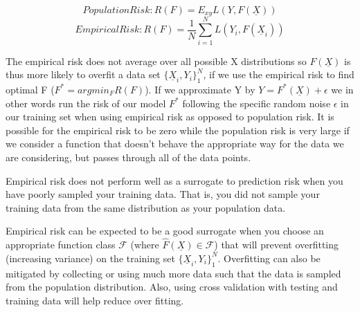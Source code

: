 \documentclass[11pt]{article}
\begin{document}
$$Population Risk: R(F) = E_{xy}L(Y,F(\underline{X}))$$
$$ Empirical Risk: R(F) = \frac{1}{N}\sum_{i=1}^NL(Y_i, F(\underline{X}_i))$$ 

\vspace{5 mm}
\noindent
The empirical risk does not average over all possible X distributions so 
$F(\underline{X})$ is thus more likely to overfit a data set 
$\{\underline{X}_i, Y_i\}_1^N$, if we use the empirical risk to find optimal F 
($F^* = argmin_FR(F)$). If we approximate Y by 
$Y=F^*(\underline{X}) + \epsilon$ we in other words run the risk of our model 
$F^*$ following the specific random noise $\epsilon$ in our training set when 
using empirical risk as opposed to population risk. It is possible for the 
empirical risk to be zero while the population risk is very large if we 
consider a function that doesn't behave the appropriate way for the data we are 
considering, but passes through all of the  data points. 

\vspace{5 mm}
\noindent
Empirical risk does not perform well as a surrogate to prediction risk when 
you have poorly sampled your training data. That is, you did not sample your 
training data from the same distribution as your population data.

\vspace{5 mm}
\noindent
Empirical risk can be expected to be a good surrogate when you choose an 
appropriate function class $\mathscr{F}$ (where 
$\hat{F}(\underline{X}) \in \mathscr{F}$) that will prevent overfitting 
(increasing variance) on the training set $\{\underline{X}_i, Y_i\}_1^N$. 
Overfitting can also be mitigated by collecting or using much more data such 
that the data is sampled from the population distribution. Also, using cross 
validation with testing and training data will help reduce over fitting.

\newpage
\begin{center}
\ \\
\end{center}
\end{document}
